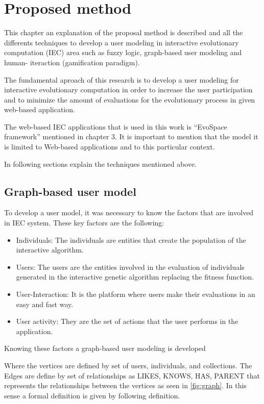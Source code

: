 \chapter{Proposed method}

This chapter an explanation of the proposal method is described and all the
differents techniques to develop a user modeling in interactive evolutionary
computation (IEC) area such as fuzzy logic, graph-based user modeling and human-
iteraction  (gamification paradigm).

The fundamental aproach of this research is to develop a user modeling for
interactive evolutionary computation in order to increase the user participation
and to minimize the amount of evaluations for the evolutionary process in given
web-based application.

The web-based IEC applications that is used in this work is “EvoSpace framework”
mentioned in chapter 3. It is important to mention that the model it is limited
to Web-based applications and to this particular context.

In following sections explain the techniques mentioned above.


\section{Graph-based user model} 

To develop a user model, it was necessary to know the factors that are involved in
IEC system. These key factors are the following:

\begin{itemize} 
\item Individuals: The individuals are entities that create the population
of the interactive algorithm.  
\item Users: The users are the entities 
involved in the evaluation of individuals generated in the interactive genetic
algorithm replacing the fitness function.
\item User-Interaction: It is the platform where users make their evaluations in an 
easy and fast way.
\item User activity: They are the set of actions that the user performs in the application. 
\end{itemize}


Knowing these factors a graph-based user modeling is developed 

Where the vertices are defined by set of users, individuals, and
collections. The Edges are define by set of relationships as LIKES, KNOWS, HAS, PARENT that represents the relationships between the vertices as seen in \ref{fig:graph}. In this sense a formal definition is given by following definition.


